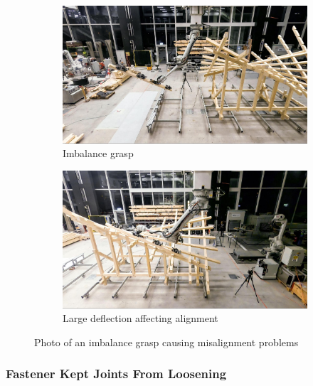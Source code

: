 \begin{figure}[!h]
    \centering
    \begin{subfigure}[b]{0.49\textwidth}
        \centering
        \includegraphics[width=\textwidth]{images/7b/img29.jpg}
        \caption{Imbalance grasp}
    \end{subfigure}
    \hfill
    \begin{subfigure}[b]{0.49\textwidth}
        \centering
        \includegraphics[width=\textwidth]{images/7b/img30.jpg}
        \caption{Large deflection affecting alignment}
    \end{subfigure}
    \caption{Photo of an imbalance grasp causing misalignment problems}
    \label{fig:imbalance-grasp-causing-misalignment-problems}
\end{figure}


\subsubsection{Fastener Kept Joints From Loosening}
\label{subsubsection:exploration-4-fastener-kept-joints-from-loosening}

